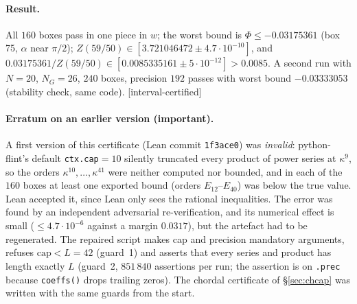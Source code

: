 \documentclass[11pt,a4paper]{article}
\theoremstyle{remark}
\theoremstyle{definition}
\theoremstyle{plain}
\theoremstyle{remark}
\newcommand{\st}[1]{\textsf{[#1]}}
\begin{document}
\paragraph{Result.} All $160$ boxes pass in one piece in $w$; the worst bound is
$\Phi\le-0.03175361$ (box 75, $\alpha$ near $\pi/2$); $Z(59/50)\in[3.721046472\pm4.7\cdot10^{-10}]$, and
$0.03175361/Z(59/50)\in[0.0085335161\pm5\cdot10^{-12}]>0.0085$. A second run with $N=20$, $N_G=26$,
$240$ boxes, precision $192$ passes with worst bound $-0.03333053$ (stability check, same code).
\st{interval-certified}

\paragraph{Erratum on an earlier version (important).} A first version of this certificate (Lean commit
\texttt{1f3ace0}) was \emph{invalid}: python-flint's default \texttt{ctx.cap}${}=10$ silently truncated every
product of power series at $\kappa^9$, so the orders $\kappa^{10},\dots,\kappa^{41}$ were neither computed nor
bounded, and in each of the $160$ boxes at least one exported bound (orders $E_{12}$--$E_{40}$) was below
the true value. Lean accepted it, since Lean only sees the rational inequalities. The error was found by
an independent adversarial re-verification, and its numerical effect is small ($\le4.7\cdot10^{-6}$ against a margin
$0.0317$), but the artefact had to be regenerated. The repaired script makes cap and precision mandatory
arguments, refuses $\mathrm{cap}<L=42$ (guard~1) and asserts that every series and product has length
exactly $L$ (guard~2, $851\,840$ assertions per run; the assertion is on \texttt{.prec} because
\texttt{coeffs()} drops trailing zeros). The chordal certificate of \S\ref{sec:chcap} was written with the
same guards from the start.
\end{document}
